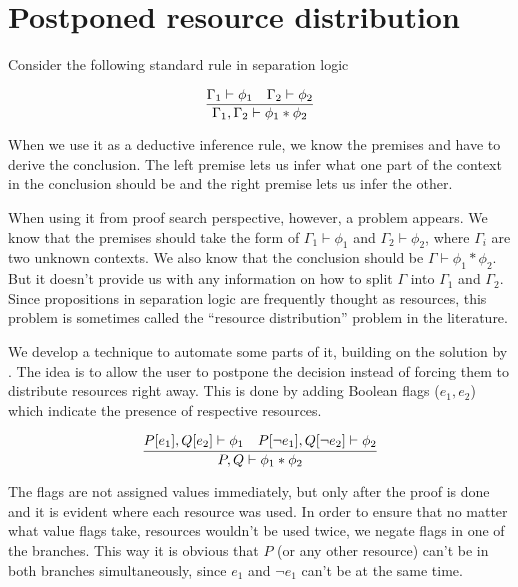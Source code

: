 \chapter{Postponed resource distribution}
\label{chap:postponed_splitting}
Consider the following standard rule in separation logic

\[\infer{\Gamma_1, \Gamma_2 \vdash \phi_1 \ast \phi_2}
        {\Gamma_1 \vdash \phi_1 &
         \Gamma_2 \vdash \phi_2} \]

When we use it as a deductive inference rule, we know the premises and have to derive the conclusion.
The left premise lets us infer what one part of the context in the conclusion should be and the right premise lets us infer the other.

When using it from proof search perspective, however, a problem appears.
We know that the premises should take the form of \(\Gamma_1 \vdash \phi_1\) and \(\Gamma_2 \vdash \phi_2\), where $\Gamma_i$ are two unknown contexts.
We also know that the conclusion should be \(\Gamma \vdash \phi_1 \ast \phi_2\).
But it doesn't provide us with any information on how to split \(\Gamma\) into \(\Gamma_1\) and \(\Gamma_2\).
Since propositions in separation logic are frequently thought as resources, this problem is sometimes called the ``resource distribution'' problem in the literature.

We develop a technique to automate some parts of it, building on the solution by \citet{harlandResourceDistributionBooleanConstraints2003}.
The idea is to allow the user to postpone the decision instead of forcing them to distribute resources right away.
This is done by adding Boolean flags (\(e_1, e_2\)) which indicate the presence of respective resources.

\[
  \infer{P, Q \vdash \phi_1 \ast \phi_2}
        {P[e_1], Q[e_2] \vdash \phi_1 &
         P[\neg {e}_1], Q[\neg {e}_2] \vdash \phi_2}
\]

The flags are not assigned values immediately, but only after the proof is done and it is evident where each resource was used.
In order to ensure that no matter what value flags take, resources wouldn't be used twice, we negate flags in one of the branches.
This way it is obvious that \(P\) (or any other resource) can't be in both branches simultaneously, since \(e_1\) and \(\neg {e}_1\) can't be \true at the same time.

